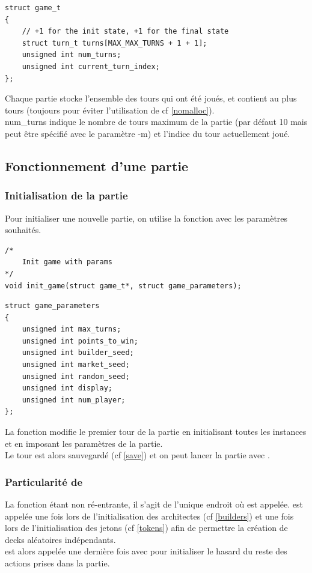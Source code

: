 \begin{lstlisting}[frame=single, caption={Implémentation de la structure game\_t}]
struct game_t
{
    // +1 for the init state, +1 for the final state
    struct turn_t turns[MAX_MAX_TURNS + 1 + 1]; 
    unsigned int num_turns;
    unsigned int current_turn_index;
};
\end{lstlisting}

Chaque partie stocke l'ensemble des tours qui ont été joués, et contient au plus\\  tours (toujours pour éviter l'utilisation de  cf \ref{nomalloc}).\\
num\_turns indique le nombre de tours maximum de la partie (par défaut 10 mais peut être spécifié avec le paramètre -m) et  l'indice du tour actuellement joué.

\subsection*{Fonctionnement d'une partie}

\subsubsection*{Initialisation de la partie}
Pour initialiser une nouvelle partie, on utilise la fonction  avec les paramètres souhaités.
\lstset{language=C, style=code}
\begin{lstlisting}[frame=single]
/*
	Init game with params
*/
void init_game(struct game_t*, struct game_parameters);
\end{lstlisting}

\begin{lstlisting}[frame=single, caption={Structure des paramètres de la partie}]
struct game_parameters
{
	unsigned int max_turns;
	unsigned int points_to_win;
	unsigned int builder_seed;
	unsigned int market_seed;
	unsigned int random_seed;
	unsigned int display;
	unsigned int num_player;
};
\end{lstlisting}

La fonction  modifie le premier tour de la partie en initialisant toutes les instances et en imposant les paramètres de la partie.\\
Le tour est alors sauvegardé (cf \ref{save}) et on peut lancer la partie avec .

\subsubsection*{Particularité de }
La fonction  étant non ré-entrante, il s'agit de l'unique endroit où  est appelée.  est appelée une fois lors de l'initialisation des architectes (cf \ref{builders}) et une fois lors de l'initialisation des jetons (cf \ref{tokens}) afin de permettre la création de decks aléatoires indépendants. \\
 est alors appelée une dernière fois avec  pour initialiser le hasard du reste des actions prises dans la partie.

